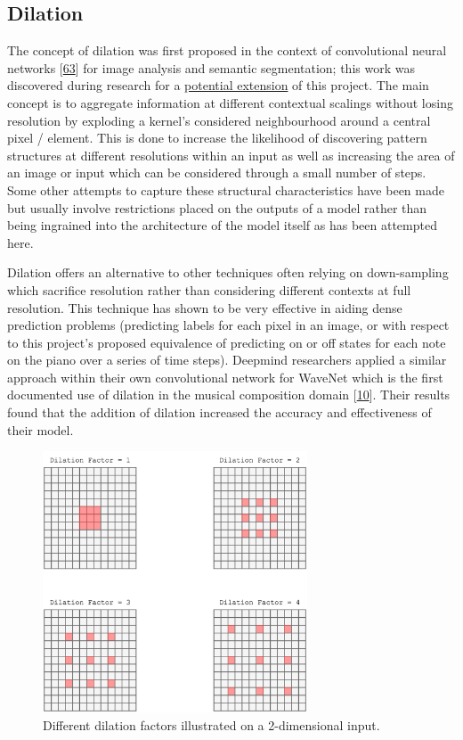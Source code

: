 \documentclass[12pt,]{article}
\begin{document}
\hypertarget{dilation}{%
\subsection{Dilation}\label{dilation}}

The concept of dilation was first proposed in the context of
convolutional neural networks
{[}\protect\hyperlink{ref-yu2015multi}{63}{]} for image analysis and
semantic segmentation; this work was discovered during research for a
\protect\hyperlink{sentimentalinputfromimages}{potential extension} of
this project. The main concept is to aggregate information at different
contextual scalings without losing resolution by exploding a kernel's
considered neighbourhood around a central pixel / element. This is done
to increase the likelihood of discovering pattern structures at
different resolutions within an input as well as increasing the area of
an image or input which can be considered through a small number of
steps. Some other attempts to capture these structural characteristics
have been made but usually involve restrictions placed on the outputs of
a model rather than being ingrained into the architecture of the model
itself as has been attempted here.

Dilation offers an alternative to other techniques often relying on
down-sampling which sacrifice resolution rather than considering
different contexts at full resolution. This technique has shown to be
very effective in aiding dense prediction problems (predicting labels
for each pixel in an image, or with respect to this project's proposed
equivalence of predicting on or off states for each note on the piano
over a series of time steps). Deepmind researchers applied a similar
approach within their own convolutional network for WaveNet which is the
first documented use of dilation in the musical composition domain
{[}\protect\hyperlink{ref-oord2016wavenet}{10}{]}. Their results found
that the addition of dilation increased the accuracy and effectiveness
of their model.

\begin{figure}
\centering
\includegraphics[width=0.7\textwidth,height=\textheight]{Images/dilation2d.png}
\caption{Different dilation factors illustrated on a 2-dimensional
input.}
\end{figure}
\end{document}
